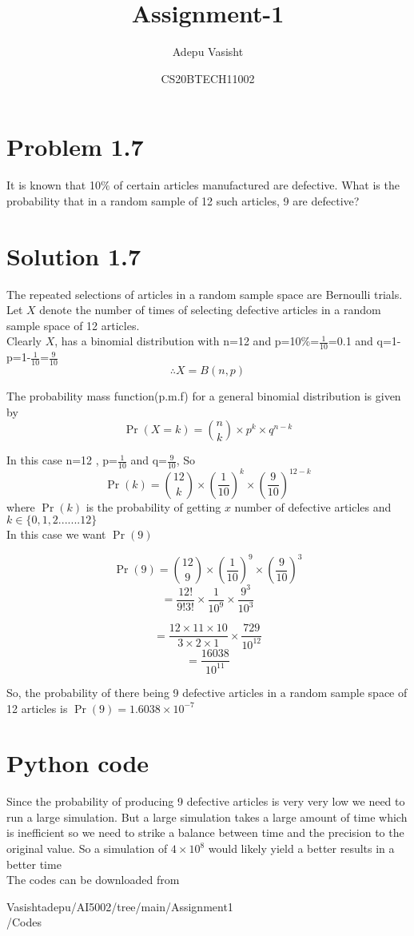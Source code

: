 \documentclass[journal,12pt,twocolumn]{IEEEtran}
\title{Assignment-1}
\author{Adepu Vasisht}
\date{CS20BTECH11002}
\begin{document}
\maketitle

\section*{Problem 1.7}
It is known that 10$\%$ of certain articles manufactured are defective. What is the probability that in a random sample of 12 such articles, 9 are defective?
\section*{Solution 1.7}
The repeated selections of articles in a random sample space are Bernoulli trials. Let $X$ denote the number of times of selecting defective articles in a random sample space of 12 articles.\\

Clearly $X$, has a binomial distribution with n=12 and p=10\%=$\frac{1}{10}$=0.1
and q=1-p=1-$\frac{1}{10}$=$\frac{9}{10}$\\

$$\therefore X = B (n,p)$$

The probability mass function(p.m.f) for a general binomial distribution is given by $$\Pr(X=k)= {n \choose k} \times p^k\times q^{n-k}$$

In this case n=12 , p=$\frac{1}{10}$ and q=$\frac{9}{10}$, So 
$$\Pr(k)={12 \choose k}\times(\frac{1}{10})^k\times(\frac{9}{10})^{12-k}$$
where $\Pr(k)$ is the probability of getting $x$ number of defective articles and $k\in \{0,1,2.......12\}$\\

In this case we want $\Pr(9)$ 
    

    
 $$\Pr(9)={12 \choose 9}\times(\frac{1}{10})^9\times(\frac{9}{10})^{3}$$
$$=\frac{12!}{9!3!}\times\frac{1}{10^9}\times\frac{9^3}{10^3}$$

$$=\frac{12\times11\times10}{3\times2\times1}\times\frac{729}{10^12}$$
$$=\frac{16038}{10^{11}}$$

So, the probability of there being 9 defective articles in a random sample space of 12 articles is $\Pr(9)=1.6038\times 10^{-7}$ 


\section*{Python code}
Since the probability of producing 9 defective articles is very very low we need to run a large simulation. But a large simulation takes a large amount of time which is inefficient so we need to strike a balance between time and the precision to the original value. So a simulation of $4\times10^8$ would likely yield a better results in a better time\\
The codes can be downloaded from

\begin{tcolorbox}{
Vasishtadepu/AI5002/tree/main/Assignment1\\/Codes
}
\end{tcolorbox}
\end{document}
